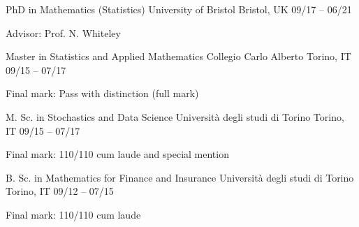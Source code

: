 

\begin{cventries}

  \cventry
    {PhD in Mathematics (Statistics)} %
    {University of Bristol} %
    {Bristol, UK} %
    {09\slash 17 -- 06\slash21} %
    {
      \begin{cvitems} %
        \item {Advisor: Prof. N. Whiteley}
      \end{cvitems}
    }

  \cventry
    {Master in Statistics and Applied Mathematics} %
    {Collegio Carlo Alberto} %
    {Torino, IT} %
    {09\slash 15 -- 07\slash 17} %
    {
      \begin{cvitems} %
        \item {Final mark: Pass with distinction (full mark)}
      \end{cvitems}
    }

  \cventry
    {M. Sc. in Stochastics and Data Science}
    {Università degli studi di Torino}
    {Torino, IT}
    {09\slash 15 -- 07\slash 17}
    {
      \begin{cvitems} %
        \item {Final mark: 110\slash 110 cum laude and special mention}
      \end{cvitems}
    }
    
  \cventry
	{B. Sc. in Mathematics for Finance and Insurance}
	{Università degli studi di Torino}
	{Torino, IT}
	{09\slash 12 -- 07\slash 15}
    {
      \begin{cvitems} %
        \item {Final mark: 110\slash 110 cum laude}
      \end{cvitems}
    }

\end{cventries}
